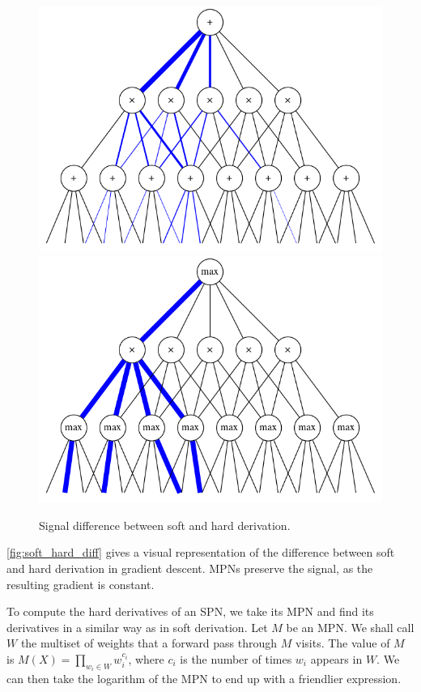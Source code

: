 \begin{figure}[h]
  \centering\includegraphics[scale=0.325]{graphs/softgrad.png}
  \includegraphics[scale=0.325]{graphs/hardgrad.png}
  \caption{Signal difference between soft and hard derivation.\label{fig:soft_hard_diff}}
\end{figure}

\autoref{fig:soft_hard_diff} gives a visual representation of the difference between soft and hard
derivation in gradient descent. MPNs preserve the signal, as the resulting gradient is constant.

To compute the hard derivatives of an SPN, we take its MPN and find its derivatives in a similar
way as in soft derivation. Let $M$ be an MPN\@. We shall call $W$ the multiset of weights that a
forward pass through $M$ visits. The value of $M$ is $M(X)=\prod_{w_i\in W}w_i^{c_i}$, where $c_i$
is the number of times $w_i$ appears in $W$. We can then take the logarithm of the MPN to end up
with a friendlier expression.

